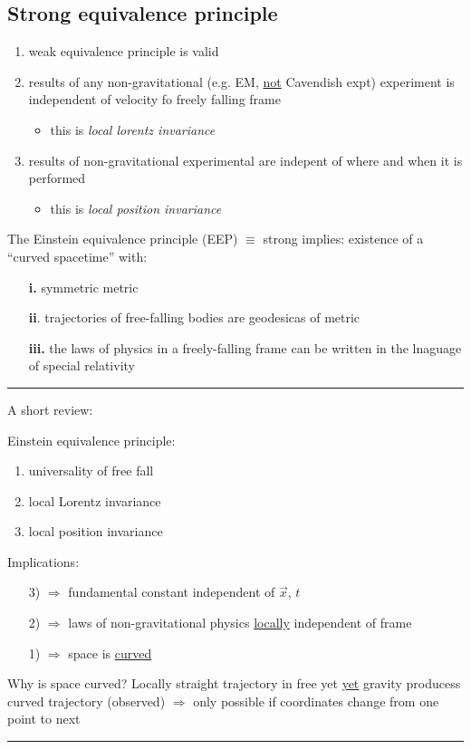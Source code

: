 \documentclass[a4paper]{article} %
\newcommand{\review}[1]
{
\hrule
A short review:

#1
\hrule
}
\begin{document}
\subsection{Strong equivalence principle}
\begin{enumerate}
\item weak equivalence principle is valid
\item results of any non-gravitational (e.g. EM, \underline{not} Cavendish expt) experiment is independent of velocity fo freely falling frame
\begin{itemize}
\item this is \emph{local lorentz invariance}
\end{itemize}
\item results of non-gravitational experimental are indepent of where and when it is performed
\begin{itemize}
\item this is \emph{local position invariance}
\end{itemize}
\end{enumerate}

The Einstein equivalence principle (EEP) $\equiv$ strong implies: existence of a ``curved spacetime'' with:
\begin{enumerate}
\item[\textbf{i.}] symmetric metric
\item[\textbf{ii}.] trajectories of free-falling bodies are geodesicas of metric
\item[\textbf{iii.}] the laws of physics in a freely-falling frame can be written in the lnaguage of special relativity
\end{enumerate}


\review{
Einstein equivalence principle:
\begin{enumerate}
\item universality of free fall
\item local Lorentz invariance
\item local position invariance
\end{enumerate}
Implications:
\begin{enumerate}
\item[3)] $\Rightarrow$ fundamental constant independent of $\vec{x}$, $t$
\item[2)] $\Rightarrow$ laws of non-gravitational physics \underline{locally} independent of frame
\item[1)] $\Rightarrow$ space is \underline{curved}
\end{enumerate}

Why is space curved? Locally straight trajectory in free yet \underline{yet} gravity producess curved trajectory (observed) $\Rightarrow$ only possible if coordinates change from one point to next
}
\end{document}
